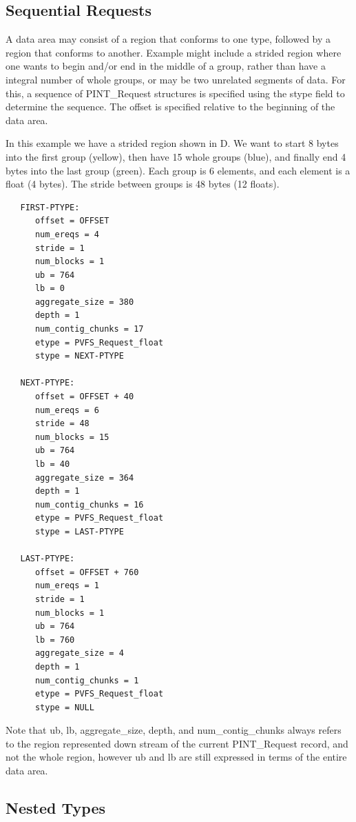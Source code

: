 \documentclass[12pt]{article} %
\begin{document}
\subsection*{Sequential Requests}

A data area may consist of a region that conforms to one type,
followed by a region that conforms to another.  Example might
include a strided region where one wants to begin and/or end
in the middle of a group, rather than have a integral number
of whole groups, or may be two unrelated segments of data.
For this, a sequence of PINT\_Request structures is specified
using the stype field to determine the sequence.  The offset
is specified relative to the beginning of the data area.

In this example we have a strided region shown in D.  We want to start
8 bytes into the first group (yellow), then have 15 whole groups (blue), and
finally end 4 bytes into the last group (green).  Each group is 6
elements, and each element is a float (4 bytes).  The stride
between groups is 48 bytes (12 floats).

\begin{verbatim}
   FIRST-PTYPE:
      offset = OFFSET
      num_ereqs = 4
      stride = 1
      num_blocks = 1
      ub = 764
      lb = 0
      aggregate_size = 380
      depth = 1
      num_contig_chunks = 17
      etype = PVFS_Request_float
      stype = NEXT-PTYPE
   
   NEXT-PTYPE:
      offset = OFFSET + 40
      num_ereqs = 6
      stride = 48
      num_blocks = 15
      ub = 764
      lb = 40
      aggregate_size = 364
      depth = 1
      num_contig_chunks = 16
      etype = PVFS_Request_float
      stype = LAST-PTYPE
   
   LAST-PTYPE:
      offset = OFFSET + 760
      num_ereqs = 1
      stride = 1
      num_blocks = 1
      ub = 764
      lb = 760
      aggregate_size = 4
      depth = 1
      num_contig_chunks = 1
      etype = PVFS_Request_float
      stype = NULL
\end{verbatim}

Note that ub, lb, aggregate\_size, depth, and num\_contig\_chunks always
refers to the region
represented down stream of the current PINT\_Request record, and not the
whole region, however ub and lb are still expressed in terms of the
entire data area.

\subsection*{Nested Types}
\end{document}
